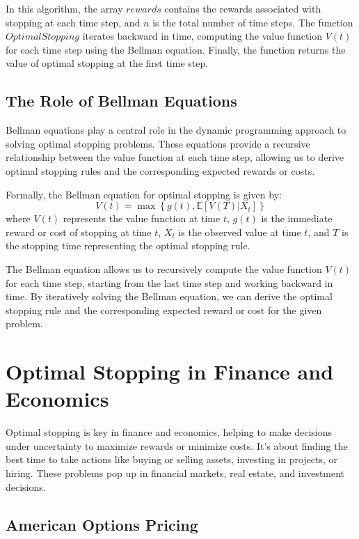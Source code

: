 \documentclass[12pt]{book} %
\begin{document}
In this algorithm, the array $rewards$ contains the rewards associated with stopping at each time step, and $n$ is the total number of time steps. The function $OptimalStopping$ iterates backward in time, computing the value function $V(t)$ for each time step using the Bellman equation. Finally, the function returns the value of optimal stopping at the first time step.

\subsection{The Role of Bellman Equations}

Bellman equations play a central role in the dynamic programming approach to solving optimal stopping problems. These equations provide a recursive relationship between the value function at each time step, allowing us to derive optimal stopping rules and the corresponding expected rewards or costs.

Formally, the Bellman equation for optimal stopping is given by:
\[
V(t) = \max \left\{ g(t), \mathbb{E}[V(T) | X_t] \right\}
\]
where \( V(t) \) represents the value function at time \( t \), \( g(t) \) is the immediate reward or cost of stopping at time \( t \), \( X_t \) is the observed value at time \( t \), and \( T \) is the stopping time representing the optimal stopping rule.

The Bellman equation allows us to recursively compute the value function \( V(t) \) for each time step, starting from the last time step and working backward in time. By iteratively solving the Bellman equation, we can derive the optimal stopping rule and the corresponding expected reward or cost for the given problem.


\section{Optimal Stopping in Finance and Economics}

Optimal stopping is key in finance and economics, helping to make decisions under uncertainty to maximize rewards or minimize costs. It's about finding the best time to take actions like buying or selling assets, investing in projects, or hiring. These problems pop up in financial markets, real estate, and investment decisions.

\subsection{American Options Pricing}
\end{document}
